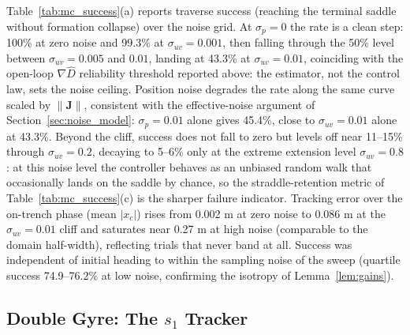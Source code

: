 \documentclass[lettersize,journal]{IEEEtran}
\begin{document}
Table~\ref{tab:mc_success}(a) reports traverse success (reaching the
terminal saddle without formation collapse) over the noise grid. At
$\sigma_p = 0$ the rate is a clean step: 100\% at zero noise and
99.3\% at $\sigma_{uv} = 0.001$, then falling through the 50\% level between
$\sigma_{uv} = 0.005$ and $0.01$, landing at 43.3\% at
$\sigma_{uv} = 0.01$, coinciding with the open-loop $\nabla\hat{D}$
reliability threshold reported above: the estimator, not the control
law, sets the noise ceiling. Position noise degrades the rate along the same curve scaled
by $\|\mathbf{J}\|$, consistent with the effective-noise argument of
Section~\ref{sec:noise_model}: $\sigma_p = 0.01$ alone gives 45.4\%,
close to $\sigma_{uv} = 0.01$ alone at 43.3\%. Beyond the cliff, success
does not fall to zero but levels off near 11--15\% through
$\sigma_{uv} = 0.2$, decaying to 5--6\% only at the extreme extension
level $\sigma_{uv} = 0.8$: at this noise level
the controller behaves as an unbiased random walk that occasionally
lands on the saddle by chance, so the straddle-retention metric of
Table~\ref{tab:mc_success}(c) is the sharper failure indicator. Tracking
error over the on-trench phase (mean $|x_c|$) rises from 0.002 m at zero
noise to 0.086 m at the $\sigma_{uv} = 0.01$ cliff and saturates near
0.27 m at high noise (comparable to the domain half-width), reflecting
trials that never band at all. Success was independent of initial
heading to within the sampling noise of the sweep (quartile success
74.9--76.2\% at low noise, confirming the isotropy of
Lemma~\ref{lem:gains}).

\subsection{Double Gyre: The $s_1$ Tracker}
\label{sec:results_oecs}

\end{document}
